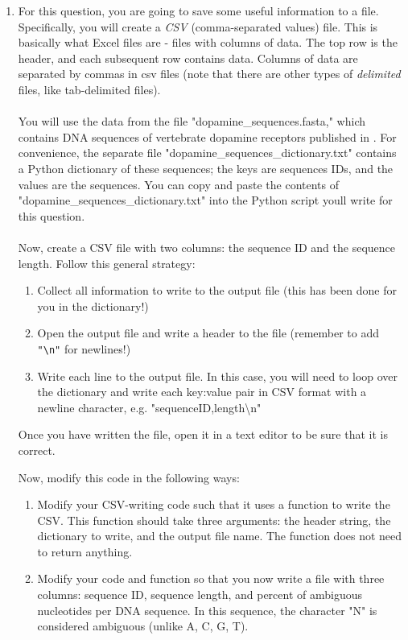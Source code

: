 \documentclass{article}[12pt]
\newcommand{\code}[1]{\texttt{#1}}  %
\begin{document}
\begin{enumerate}[itemsep=5ex]
	\item For this question, you are going to save some useful information to a file. Specifically, you will create a \emph{CSV} (comma-separated values) file. This is basically what Excel files are - files with columns of data. The top row is the header, and each subsequent row contains data. Columns of data are separated by commas in csv files (note that there are other types of \emph{delimited} files, like tab-delimited files). 
	\\\\ You will use the data from the file "dopamine\_sequences.fasta," which contains DNA sequences of vertebrate dopamine receptors published in \citet{SpielmanKumarWilke2015}. For convenience, the separate file "dopamine\_sequences\_dictionary.txt" contains a Python dictionary of these sequences; the keys are sequences IDs, and the values are the sequences. You can copy and paste the contents of "dopamine\_sequences\_dictionary.txt" into the Python script you\textquotesingle ll write for this question.
	\\\\ Now, create a CSV file with two columns: the sequence ID and the sequence length. Follow this general strategy:
	\begin{enumerate}[itemsep=2ex]
		\item Collect all information to write to the output file (this has been done for you in the dictionary!)
		\item Open the output file and write a header to the file (remember to add \code{"\textbackslash n"} for newlines!)
		\item Write each line to the output file. In this case, you will need to loop over the dictionary and write each key:value pair in CSV format with a newline character, e.g. "sequenceID,length\textbackslash n"
	\end{enumerate}
	Once you have written the file, open it in a text editor to be sure that it is correct.
	
	Now, modify this code in the following ways:
	\begin{enumerate}[itemsep=2ex]
		
		\item Modify your CSV-writing code such that it uses a function to write the CSV. This function should take three arguments: the header string, the dictionary to write, and the output file name. The function does not need to return anything.
		
		\item Modify your code and function so that you now write a file with three columns: sequence ID, sequence length, and percent of ambiguous nucleotides per DNA sequence. In this sequence, the character "N" is considered ambiguous (unlike A, C, G, T).
		
	\end{enumerate}
\end{enumerate}	

	




\end{document}
